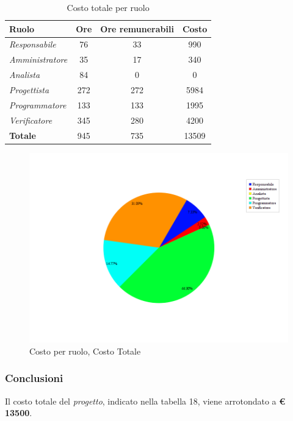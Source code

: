 \begin{table}[H]
	\begin{center}
		\begin{tabular}{|l|c|c|c|}
			\hline
			\textbf{Ruolo}	& \textbf{Ore} &	\textbf{Ore remunerabili}	 &\textbf{Costo} \\
			\hline
			\textit{Responsabile}	&	76	&	33	&	990	\\
			\hline
			\textit{Amministratore}	&	35	&	17	&	340	\\
			\hline
			\textit{Analista}	&	84	&	0	&	0	\\
			\hline
			\textit{Progettista}		&	272	&	272	&	5984	\\
			\hline
			\textit{Programmatore}	&	133	&	133	&	1995	\\
			\hline
			\textit{Verificatore}	&	345	&	280	&	4200	\\
			\hline
			\textbf{Totale}	&	945	&	735	&	13509	\\
			\hline
		\end{tabular}
	\end{center}
	\caption{Costo totale per ruolo}
\end{table}

\begin{figure}[H]
	\centering
	\includegraphics[scale=0.4]{immagini/Grafi/CostoTot}
	\caption{Costo per ruolo, Costo Totale}
\end{figure}

\subsubsection{Conclusioni}
Il costo totale del \textit{progetto}, indicato nella tabella 18, viene arrotondato a \textbf{€ 13500}.\\

